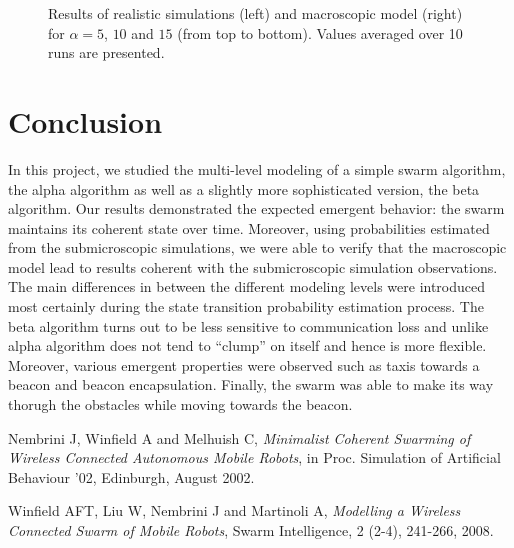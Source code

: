 \documentclass[a4paper, 10pt, conference]{ieeeconf}
\begin{document}
\begin{figure}[p]
\begin{center}
\begin{tabular}{lr}
      \end{tabular}
      \caption{Results of realistic simulations (left) and macroscopic model (right) for $\alpha = 5$, $10$ and $15$ (from top to bottom). Values averaged over 10 runs are presented.}
      \label{fig:main-results}
    \end{center}
  \end{figure}


\section{Conclusion}
In this project, we studied the multi-level modeling of a simple swarm algorithm, the alpha algorithm as well as a slightly more sophisticated version, the beta algorithm. Our results demonstrated the expected emergent behavior: the swarm maintains its  coherent state over time. Moreover, using probabilities estimated from the submicroscopic simulations, we were able to verify that the macroscopic model lead to results coherent with the submicroscopic simulation observations. The main differences in between the different modeling levels were introduced most certainly during the state transition probability estimation process. The beta algorithm turns out to be less sensitive to communication loss and unlike alpha algorithm does not tend to ``clump'' on itself and hence is more flexible. Moreover, various emergent properties were observed such as taxis towards a beacon and beacon encapsulation. Finally, the swarm was able to make its way thorugh the obstacles while moving towards the beacon.




\begin{thebibliography}{99}

   Nembrini J, Winfield A and Melhuish C, \textit{Minimalist Coherent Swarming of Wireless Connected Autonomous Mobile Robots}, in Proc. Simulation of Artificial Behaviour '02, Edinburgh, August 2002.

   Winfield AFT, Liu W, Nembrini J and Martinoli A, \textit{Modelling a Wireless Connected Swarm of Mobile Robots}, Swarm Intelligence, 2 (2-4), 241-266, 2008.

\end{thebibliography}
\end{document}
